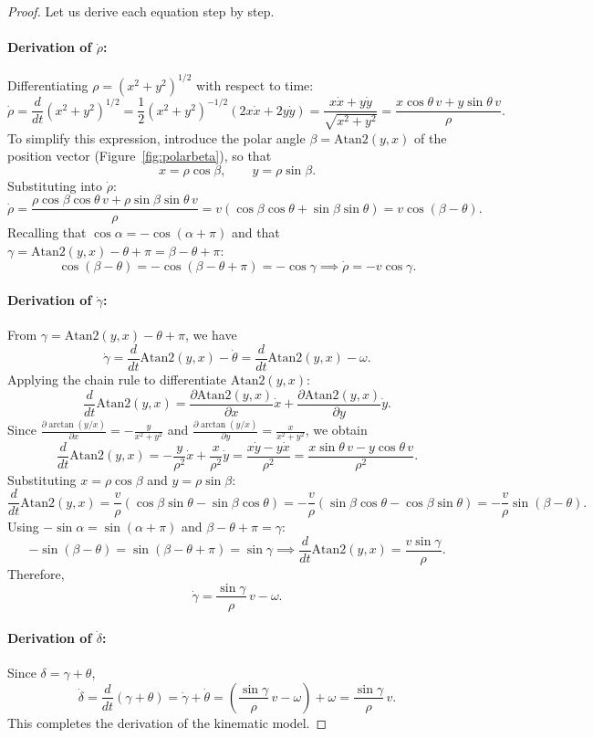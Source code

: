 \documentclass[11pt,a4paper]{article}
\theoremstyle{plain}
\theoremstyle{definition}
\theoremstyle{remark}
\begin{document}
\begin{proof}
Let us derive each equation step by step.

\paragraph{Derivation of $\dot\rho$:}
Differentiating $\rho = (x^2+y^2)^{1/2}$ with respect to time:
\[
\dot\rho = \frac{d}{dt}(x^2+y^2)^{1/2} = \frac{1}{2}(x^2+y^2)^{-1/2}(2x\dot x + 2y\dot y) = \frac{x\dot x + y\dot y}{\sqrt{x^2+y^2}} = \frac{x\cos\theta\,v + y\sin\theta\,v}{\rho}.
\]
To simplify this expression, introduce the polar angle $\beta = \mathrm{Atan2}(y,x)$ of the position vector (Figure~\ref{fig:polarbeta}), so that
\[
x = \rho\cos\beta,\qquad y = \rho\sin\beta .
\]
Substituting into $\dot\rho$:
\[
\dot\rho = \frac{\rho\cos\beta\cos\theta\,v + \rho\sin\beta\sin\theta\,v}{\rho} = v(\cos\beta\cos\theta + \sin\beta\sin\theta) = v\cos(\beta-\theta).
\]
Recalling that $\cos\alpha = -\cos(\alpha+\pi)$ and that $\gamma = \mathrm{Atan2}(y,x)-\theta+\pi = \beta-\theta+\pi$:
\[
\cos(\beta-\theta) = -\cos(\beta-\theta+\pi) = -\cos\gamma \implies \dot\rho = -v\cos\gamma .
\]

\paragraph{Derivation of $\dot\gamma$:}
From $\gamma = \mathrm{Atan2}(y,x)-\theta+\pi$, we have
\[
\dot\gamma = \frac{d}{dt}\mathrm{Atan2}(y,x) - \dot\theta = \frac{d}{dt}\mathrm{Atan2}(y,x) - \omega .
\]
Applying the chain rule to differentiate $\mathrm{Atan2}(y,x)$:
\[
\frac{d}{dt}\mathrm{Atan2}(y,x) = \frac{\partial\mathrm{Atan2}(y,x)}{\partial x}\dot x + \frac{\partial\mathrm{Atan2}(y,x)}{\partial y}\dot y .
\]
Since $\frac{\partial\arctan(y/x)}{\partial x} = -\frac{y}{x^2+y^2}$ and $\frac{\partial\arctan(y/x)}{\partial y} = \frac{x}{x^2+y^2}$, we obtain
\[
\frac{d}{dt}\mathrm{Atan2}(y,x) = -\frac{y}{\rho^2}\dot x + \frac{x}{\rho^2}\dot y = \frac{x\dot y - y\dot x}{\rho^2} = \frac{x\sin\theta\,v - y\cos\theta\,v}{\rho^2}.
\]
Substituting $x = \rho\cos\beta$ and $y = \rho\sin\beta$:
\[
\frac{d}{dt}\mathrm{Atan2}(y,x) = \frac{v}{\rho}(\cos\beta\sin\theta - \sin\beta\cos\theta) = -\frac{v}{\rho}(\sin\beta\cos\theta - \cos\beta\sin\theta) = -\frac{v}{\rho}\sin(\beta-\theta).
\]
Using $-\sin\alpha = \sin(\alpha+\pi)$ and $\beta-\theta+\pi = \gamma$:
\[
-\sin(\beta-\theta) = \sin(\beta-\theta+\pi) = \sin\gamma \implies \frac{d}{dt}\mathrm{Atan2}(y,x) = \frac{v\sin\gamma}{\rho}.
\]
Therefore,
\[
\dot\gamma = \frac{\sin\gamma}{\rho}\,v - \omega .
\]

\paragraph{Derivation of $\dot\delta$:}
Since $\delta = \gamma+\theta$,
\[
\dot\delta = \frac{d}{dt}(\gamma+\theta) = \dot\gamma + \dot\theta = \left(\frac{\sin\gamma}{\rho}\,v - \omega\right) + \omega = \frac{\sin\gamma}{\rho}\,v .
\]
This completes the derivation of the kinematic model.
\end{proof}
\end{document}
